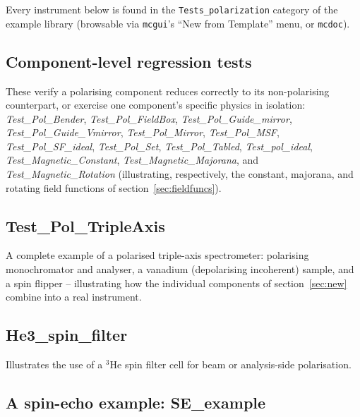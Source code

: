 Every instrument below is found in the \texttt{Tests\_polarization}
category of the example library (browsable via \texttt{mcgui}'s
``New from Template'' menu, or \texttt{mcdoc}).

\subsection{Component-level regression tests}
These verify a polarising component reduces correctly to its
non-polarising counterpart, or exercise one component's specific physics
in isolation: \textit{Test\_Pol\_Bender}, \textit{Test\_Pol\_FieldBox},
\textit{Test\_Pol\_Guide\_mirror}, \textit{Test\_Pol\_Guide\_Vmirror},
\textit{Test\_Pol\_Mirror}, \textit{Test\_Pol\_MSF},
\textit{Test\_Pol\_SF\_ideal}, \textit{Test\_Pol\_Set},
\textit{Test\_Pol\_Tabled}, \textit{Test\_pol\_ideal},
\textit{Test\_Magnetic\_Constant}, \textit{Test\_Magnetic\_Majorana}, and
\textit{Test\_Magnetic\_Rotation} (illustrating, respectively, the
constant, majorana, and rotating field functions of
section~\ref{sec:fieldfuncs}).

\subsection{Test\_Pol\_TripleAxis}
A complete example of a polarised triple-axis spectrometer: polarising
monochromator and analyser, a vanadium (depolarising incoherent) sample,
and a spin flipper -- illustrating how the individual components of
section~\ref{sec:new} combine into a real instrument.

\subsection{He3\_spin\_filter}
Illustrates the use of a $^3$He spin filter cell for beam or analysis-side
polarisation.

\subsection{A spin-echo example: SE\_example}
\label{sec:spinecho}

